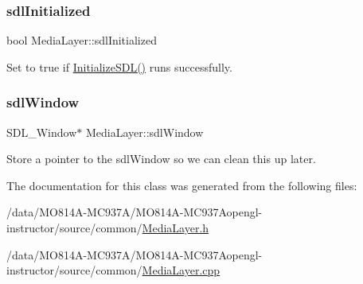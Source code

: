 \subsubsection{\texorpdfstring{sdl\+Initialized}{sdlInitialized}}
{\footnotesize\ttfamily bool Media\+Layer\+::sdl\+Initialized\hspace{0.3cm}{\ttfamily [private]}}



Set to true if \hyperlink{class_media_layer_ad72130dbe963e351d5749a7f48b4ef97}{Initialize\+S\+D\+L()} runs successfully.

\hypertarget{class_media_layer_a769679df4457ecbe60e9668199e8788b}{}\label{class_media_layer_a769679df4457ecbe60e9668199e8788b}
\subsubsection{\texorpdfstring{sdl\+Window}{sdlWindow}}
{\footnotesize\ttfamily S\+D\+L\+\_\+\+Window$\ast$ Media\+Layer\+::sdl\+Window\hspace{0.3cm}{\ttfamily [private]}}



Store a pointer to the sdl\+Window so we can clean this up later.



The documentation for this class was generated from the following files\+:\begin{DoxyCompactItemize}
\item
/data/MO814A-MC937A/MO814A-MC937Aopengl-\/instructor/source/common/\hyperlink{_media_layer_8h}{Media\+Layer.\+h}\item
/data/MO814A-MC937A/MO814A-MC937Aopengl-\/instructor/source/common/\hyperlink{_media_layer_8cpp}{Media\+Layer.\+cpp}\end{DoxyCompactItemize}
